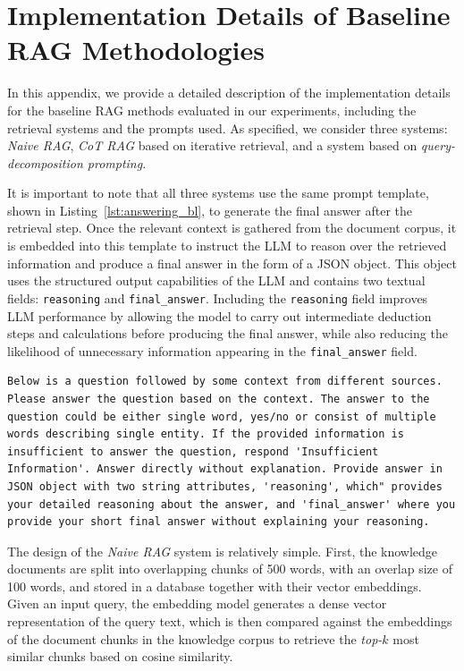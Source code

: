\documentclass{article}
\begin{document}
  


\appendix
\section{Implementation Details of Baseline RAG Methodologies}

In this appendix, we provide a detailed description of the implementation details for the baseline RAG methods evaluated in our experiments, including the retrieval systems and the prompts used. As specified, we consider three systems: \emph{Naive RAG}, \emph{CoT RAG} based on iterative retrieval, and a system based on \emph{query-decomposition prompting}. 

It is important to note that all three systems use the same prompt template, shown in Listing~\ref{lst:answering_bl}, to generate the final answer after the retrieval step. Once the relevant context is gathered from the document corpus, it is embedded into this template to instruct the LLM to reason over the retrieved information and produce a final answer in the form of a JSON object. This object uses the structured output capabilities of the LLM and contains two textual fields: \verb|reasoning| and \verb|final_answer|. Including the \verb|reasoning| field improves LLM performance by allowing the model to carry out intermediate deduction steps and calculations before producing the final answer, while also reducing the likelihood of unnecessary information appearing in the \verb|final_answer| field.


\begin{lstlisting}[style=baselinestyle, caption={Answering prompt for baseline systems}, label={lst:answering_bl}]
Below is a question followed by some context from different sources. Please answer the question based on the context. The answer to the question could be either single word, yes/no or consist of multiple words describing single entity. If the provided information is insufficient to answer the question, respond 'Insufficient Information'. Answer directly without explanation. Provide answer in JSON object with two string attributes, 'reasoning', which" provides your detailed reasoning about the answer, and 'final_answer' where you provide your short final answer without explaining your reasoning.
\end{lstlisting}

The design of the \emph{Naive RAG} system is relatively simple. First, the knowledge documents are split into overlapping chunks of 500 words, with an overlap size of 100 words, and stored in a database together with their vector embeddings. Given an input query, the embedding model generates a dense vector representation of the query text, which is then compared against the embeddings of the document chunks in the knowledge corpus to retrieve the \textit{top-$k$} most similar chunks based on cosine similarity.
\end{document}
